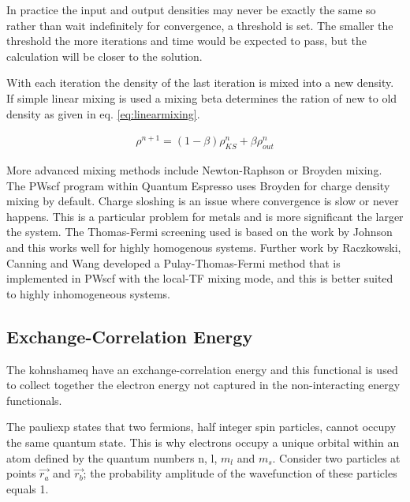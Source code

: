 In practice the input and output densities may never be exactly the same so rather than wait indefinitely for convergence, a threshold is set.  The smaller the threshold the more iterations and time would be expected to pass, but the calculation will be closer to the solution.

With each iteration the density of the last iteration is mixed into a new density.  If simple linear mixing is used a mixing beta determines the ration of new to old density as given in eq. \ref{eq:linearmixing}\cite{jfannett1996}.

\begin{equation}
\begin{split}
\rho^{n+1} = (1 - \beta) \rho_{KS}^{n} + \beta \rho_{out}^{n}
\end{split}
\label{eq:linearmixing}
\end{equation}

More advanced mixing methods include Newton-Raphson or Broyden mixing.  The PWscf program within Quantum Espresso uses Broyden for charge density mixing by default.  Charge sloshing is an issue where convergence is slow or never happens.  This is a particular problem for metals\cite{chargesloshing2} and is more significant the larger the system\cite{localtfRaczkowski}.  The Thomas-Fermi screening used is based on the work by Johnson\cite{thomasfermijohnson} and this works well for highly homogenous systems.  Further work by Raczkowski, Canning and Wang\cite{localtfraczkowski} developed a Pulay-Thomas-Fermi method that is implemented in PWscf with the local-TF mixing mode, and this is better suited to highly inhomogeneous systems.

\FloatBarrier
\subsection{Exchange-Correlation Energy}

The \Gls{kohnshameq} have an exchange-correlation energy and this functional is used to collect together the electron energy not captured in the non-interacting energy functionals.

The \Gls{pauliexp} states that two \gls{fermion}s, half integer spin particles, cannot occupy the same quantum state.  This is why electrons occupy a unique orbital within an atom defined by the quantum numbers n, l, $m_l$ and $m_s$.  Consider two particles at points $\vec{r_a}$ and $\vec{r_b}$; the probability amplitude of the wavefunction of these particles equals 1.

